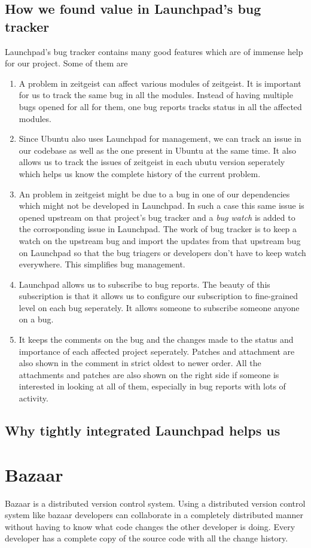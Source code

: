 \subsection{How we found value in Launchpad's bug tracker}
Launchpad's bug tracker contains many good features which are of immense help for our 
project. Some of them are
\begin{enumerate}
\item A problem in zeitgeist can affect various modules of zeitgeist. It is important for 
us to track the same bug in all the modules. Instead of having multiple bugs opened for 
all for them, one bug reports tracks status in all the affected modules.
\item Since Ubuntu also uses Launchpad for management, we can track an issue in our codebase 
as well as the one present in Ubuntu at the same time. It also allows us to track the issues 
of zeitgeist in each ubutu version seperately which helps us know the complete history 
of the current problem.
\item An problem in zeitgeist might be due to a bug in one of our dependencies which might 
not be developed in Launchpad. In such a case this same issue is opened upstream on that 
project's bug tracker and a \textit{bug watch} is added to the corrosponding issue in Launchpad. 
The work of bug tracker is to keep a watch on the upstream bug and import the updates from that 
upstream bug on Launchpad so that the bug triagers or developers don't have to keep watch 
everywhere. This simplifies bug management.
\item Launchpad allows us to subscribe to bug reports. The beauty of this subscription is that 
it allows us to configure our subscription to fine-grained level on each bug seperately. It 
allows someone to subscribe someone anyone on a bug.
\item It keeps the comments on the bug and the changes made to the status and importance of 
each affected project seperately. Patches and attachment are also shown in the comment in 
strict oldest to newer order. All the attachments and patches are also shown on the right 
side if someone is interested in looking at all of them, especially in bug reports with lots 
of activity.
\end{enumerate}
\subsection{Why tightly integrated Launchpad helps us}

\section{Bazaar}
Bazaar is a distributed version control system. Using a distributed version control 
system like bazaar developers can collaborate in a completely distributed manner 
without having to know what code changes the other developer is doing. Every developer 
has a complete copy of the source code with all the change history.

